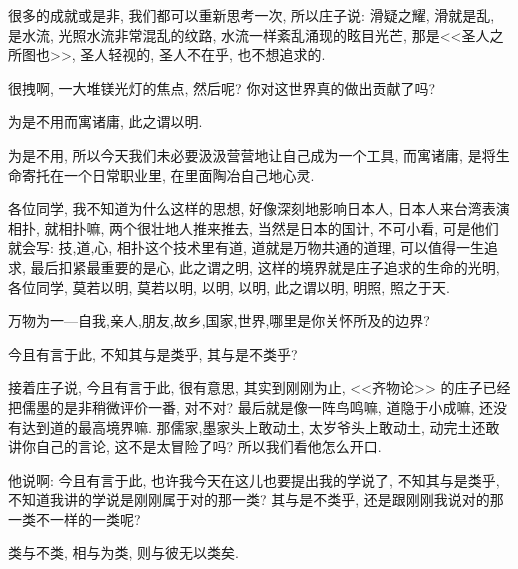 \documentclass[11pt]{article}
\begin{document}
\vspace{-0.5cm}

很多的成就或是非, 我们都可以重新思考一次, 所以庄子说: {\color{blue} 滑疑之耀, } 滑就是乱, 是水流, 光照水流非常混乱的纹路, 水流一样紊乱涌现的眩目光芒, 那是<<圣人之所图也>>, 圣人轻视的, 圣人不在乎, 也不想追求的. 

很拽啊, 一大堆镁光灯的焦点, 然后呢? 你对这世界真的做出贡献了吗? 
 
\begin{center}
	{\color{magenta} 为是不用而寓诸庸, 此之谓以明.}
\end{center}

\vspace{-0.5cm}

{\color{blue} 为是不用}, 所以今天我们未必要汲汲营营地让自己成为一个工具, {\color{blue} 而寓诸庸}, 是将生命寄托在一个日常职业里, 在里面陶冶自己地心灵.

各位同学, 我不知道为什么这样的思想, 好像深刻地影响日本人, 日本人来台湾表演相扑, 就相扑嘛, 两个很壮地人推来推去, 当然是日本的国计, 不可小看, 可是他们就会写: 技,道,心, 相扑这个技术里有道, 道就是万物共通的道理, 可以值得一生追求, 最后扣紧最重要的是心, {\color{blue} 此之谓之明}, 这样的境界就是庄子追求的生命的光明, 各位同学, 莫若以明, 莫若以明, 以明, 以明, 此之谓以明, 明照, 照之于天. 

{\Large {\color{purple} 万物为一---自我,亲人,朋友,故乡,国家,世界,哪里是你关怀所及的边界?}}

\begin{center}
	{\color{magenta} 今且有言于此, 不知其与是类乎, 其与是不类乎?}
\end{center}

\vspace{-0.5cm}

接着庄子说, {\color{blue} 今且有言于此}, 很有意思, 其实到刚刚为止, <<齐物论>> 的庄子已经把儒墨的是非稍微评价一番, 对不对? 最后就是像一阵鸟鸣嘛, 道隐于小成嘛, 还没有达到道的最高境界嘛. 那儒家,墨家头上敢动土, 太岁爷头上敢动土, 动完土还敢讲你自己的言论, 这不是太冒险了吗? 所以我们看他怎么开口. 

他说啊: {\color{blue} 今且有言于此}, 也许我今天在这儿也要提出我的学说了, {\color{blue} 不知其与是类乎}, 不知道我讲的学说是刚刚属于对的那一类? {\color{blue} 其与是不类乎}, 还是跟刚刚我说对的那一类不一样的一类呢? 

\begin{center}
	{\color{magenta} 类与不类, 相与为类, 则与彼无以类矣.}
\end{center}

\vspace{-0.5cm}
\end{document}
